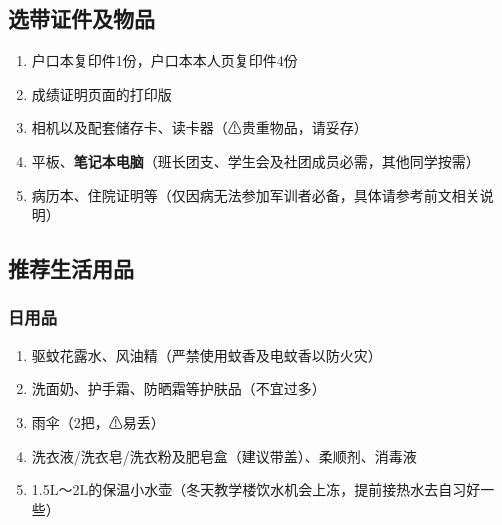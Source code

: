 \subsection[选带证件及物品]{选带证件及物品}
\begin{enumerate}
    \item 户口本复印件1份，户口本本人页复印件4份\footnotemark
    \item 成绩证明页面的打印版\footnotemark
    \item 相机以及配套储存卡、读卡器（⚠贵重物品，请妥存）
    \item 平板\footnotemark、\textbf{笔记本电脑}（班长团支、学生会及社团成员必需，其他同学按需）
    \item 病历本、住院证明等（仅因病无法参加军训者必备，具体请参考前文相关说明）
\end{enumerate}

\subsection[推荐生活用品]{推荐生活用品}

\subsubsection[日用品]{日用品}
\begin{enumerate}
    \item 驱蚊花露水、风油精（严禁使用蚊香及电蚊香以防火灾）
    \item 洗面奶、护手霜、防晒霜等护肤品（不宜过多）
    \item 雨伞（2把，⚠易丢）
    \item 洗衣液/洗衣皂/洗衣粉及肥皂盒（建议带盖）、柔顺剂、消毒液
    \item 1.5L～2L的保温小水壶（冬天教学楼饮水机会上冻，提前接热水去自习好一些）
\end{enumerate}

